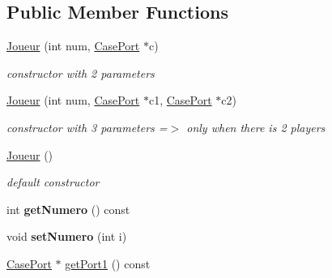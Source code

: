 \subsection*{Public Member Functions}
\begin{DoxyCompactItemize}
\item 
\hypertarget{class_joueur_a2c6463b358d3d2629b2e7f1c4ee9436c}{
\hyperlink{class_joueur_a2c6463b358d3d2629b2e7f1c4ee9436c}{Joueur} (int num, \hyperlink{class_case_port}{CasePort} $\ast$c)}
\label{class_joueur_a2c6463b358d3d2629b2e7f1c4ee9436c}

\begin{DoxyCompactList}\small\item\em constructor with 2 parameters \item\end{DoxyCompactList}\item 
\hypertarget{class_joueur_a1f01deec8873ddc3d503ae5567ad7e95}{
\hyperlink{class_joueur_a1f01deec8873ddc3d503ae5567ad7e95}{Joueur} (int num, \hyperlink{class_case_port}{CasePort} $\ast$c1, \hyperlink{class_case_port}{CasePort} $\ast$c2)}
\label{class_joueur_a1f01deec8873ddc3d503ae5567ad7e95}

\begin{DoxyCompactList}\small\item\em constructor with 3 parameters =$>$ only when there is 2 players \item\end{DoxyCompactList}\item 
\hypertarget{class_joueur_add6c98be3020651d84f6d75ccc1d867e}{
\hyperlink{class_joueur_add6c98be3020651d84f6d75ccc1d867e}{Joueur} ()}
\label{class_joueur_add6c98be3020651d84f6d75ccc1d867e}

\begin{DoxyCompactList}\small\item\em default constructor \item\end{DoxyCompactList}\item 
\hypertarget{class_joueur_ab43acc166a8ccdef4821bab367e6d157}{
int {\bfseries getNumero} () const }
\label{class_joueur_ab43acc166a8ccdef4821bab367e6d157}

\item 
\hypertarget{class_joueur_af1d118251650c4dbebdea2aaf08fcf92}{
void {\bfseries setNumero} (int i)}
\label{class_joueur_af1d118251650c4dbebdea2aaf08fcf92}

\item 
\hypertarget{class_joueur_a94c4a4b3ce35ab280bca6ba875ce75de}{
\hyperlink{class_case_port}{CasePort} $\ast$ \hyperlink{class_joueur_a94c4a4b3ce35ab280bca6ba875ce75de}{getPort1} () const }
\label{class_joueur_a94c4a4b3ce35ab280bca6ba875ce75de}


\end{DoxyCompactItemize}
